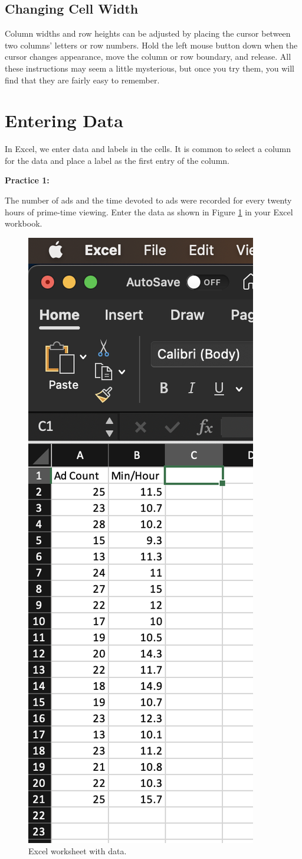 \documentclass[
]{book}
\begin{document}
\hypertarget{changing-cell-width}{%
\subsection{Changing Cell Width}\label{changing-cell-width}}

Column widths and row heights can be adjusted by placing the cursor between two columns' letters or row numbers. Hold the left mouse button down when the cursor changes appearance, move the column or row boundary, and release.
All these instructions may seem a little mysterious, but once you try them, you will find that they are fairly easy to remember.

\hypertarget{entering-data}{%
\section{Entering Data}\label{entering-data}}

In Excel, we enter data and labels in the cells. It is common to select a column for the data and place a label as the first entry of the column.

\textbf{Practice 1:}

The number of ads and the time devoted to ads were recorded for every twenty hours of prime-time viewing. Enter the data as shown in Figure \ref{fig:entering-data} in your Excel workbook.

\begin{figure}

{\centering \includegraphics[width=0.25\linewidth]{entering_data} 

}

\caption{Excel worksheet with data.}\label{fig:entering-data}
\end{figure}
\end{document}
